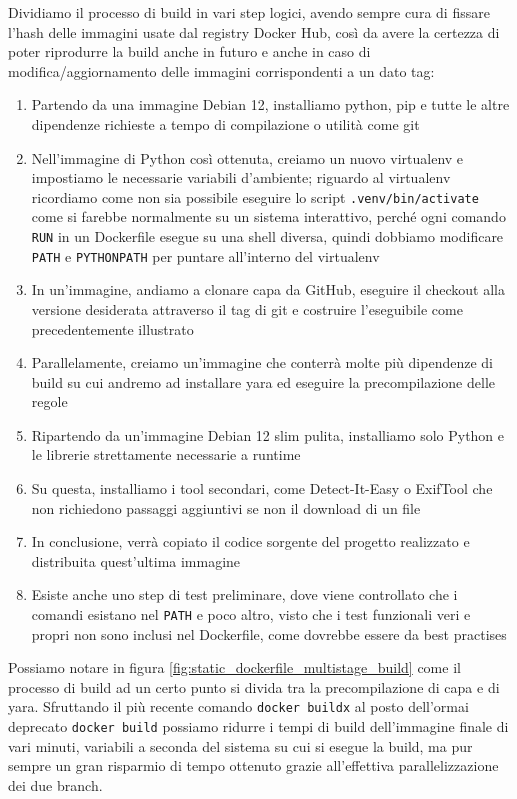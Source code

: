 Dividiamo il processo di build in vari step logici, avendo sempre cura di fissare l'hash delle immagini usate dal registry Docker Hub, così da avere la certezza di poter riprodurre la build anche in futuro e anche in caso di modifica/aggiornamento delle immagini corrispondenti a un dato tag:
\begin{enumerate}
    \item Partendo da una immagine Debian 12, installiamo python, pip e tutte le altre dipendenze richieste a tempo di compilazione o utilità come git
    \item Nell'immagine di Python così ottenuta, creiamo un nuovo virtualenv e impostiamo le necessarie variabili d'ambiente; riguardo al virtualenv ricordiamo come non sia possibile eseguire lo script \texttt{.venv/bin/activate} come si farebbe normalmente su un sistema interattivo, perché ogni comando \texttt{RUN} in un Dockerfile esegue su una shell diversa, quindi dobbiamo modificare \texttt{PATH} e \texttt{PYTHONPATH} per puntare all'interno del virtualenv
    \item In un'immagine, andiamo a clonare capa da GitHub, eseguire il checkout alla versione desiderata attraverso il tag di git e costruire l'eseguibile come precedentemente illustrato
    \item Parallelamente, creiamo un'immagine che conterrà molte più dipendenze di build su cui andremo ad installare yara ed eseguire la precompilazione delle regole
    \item Ripartendo da un'immagine Debian 12 slim pulita, installiamo solo Python e le librerie strettamente necessarie a runtime
    \item Su questa, installiamo i tool secondari, come Detect-It-Easy o ExifTool che non richiedono passaggi aggiuntivi se non il download di un file
    \item In conclusione, verrà copiato il codice sorgente del progetto realizzato e distribuita quest'ultima immagine
    \item Esiste anche uno step di test preliminare, dove viene controllato che i comandi esistano nel \texttt{PATH} e poco altro, visto che i test funzionali veri e propri non sono inclusi nel Dockerfile, come dovrebbe essere da best practises
\end{enumerate}

Possiamo notare in figura \ref{fig:static_dockerfile_multistage_build} come il processo di build ad un certo punto si divida tra la precompilazione di capa e di yara. Sfruttando il più recente comando \texttt{docker buildx} al posto dell'ormai deprecato \texttt{docker build} possiamo ridurre i tempi di build dell'immagine finale di vari minuti, variabili a seconda del sistema su cui si esegue la build, ma pur sempre un gran risparmio di tempo ottenuto grazie all'effettiva parallelizzazione dei due branch.

